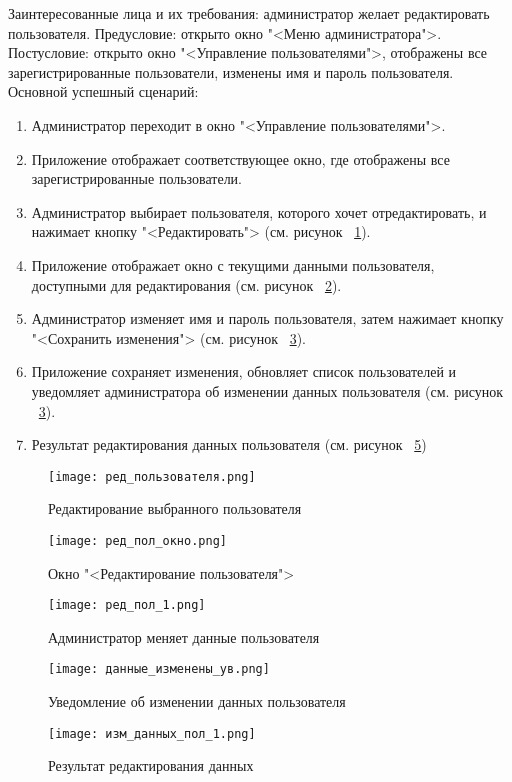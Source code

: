 Заинтересованные лица и их требования: администратор желает редактировать пользователя.
\newline Предусловие: открыто окно "<Меню администратора">.
\newline Постусловие: открыто окно "<Управление пользователями">, отображены все зарегистрированные пользователи, изменены имя и пароль пользователя.
\newline Основной успешный сценарий:
\begin{enumerate}
	\item Администратор переходит в окно "<Управление пользователями">.
	\item Приложение отображает соответствующее окно, где отображены все зарегистрированные пользователи.
	\item Администратор выбирает пользователя, которого хочет отредактировать, и нажимает кнопку "<Редактировать"> (см. рисунок ~\ref{edit_user:image}).
	\item Приложение отображает окно с текущими данными пользователя, доступными для редактирования (см. рисунок ~\ref{edit_user_window:image}).
	\item Администратор изменяет имя и пароль пользователя, затем нажимает кнопку "<Сохранить изменения"> (см. рисунок ~\ref{edit_user_1:image}).
	\item Приложение сохраняет изменения, обновляет список пользователей и уведомляет администратора об изменении данных пользователя (см. рисунок ~\ref{edit_user_1:image}).
	\item Результат редактирования данных пользователя (см. рисунок ~\ref{edit_user_2:image})
\end{enumerate}

\begin{figure}[H]
	\centering
	\texttt{[image: ред\_пользователя.png]}
	\caption{Редактирование выбранного пользователя}
	\label{edit_user:image}
\end{figure}
\begin{figure}[H]
	\centering
	\texttt{[image: ред\_пол\_окно.png]}
	\caption{Окно "<Редактирование пользователя">}
	\label{edit_user_window:image}
\end{figure}
\begin{figure}[H]
	\centering
	\texttt{[image: ред\_пол\_1.png]}
	\caption{Администратор меняет данные пользователя}
	\label{edit_user_1:image}
\end{figure}
\begin{figure}[H]
	\centering
	\texttt{[image: данные\_изменены\_ув.png]}
	\caption{Уведомление об изменении данных пользователя}
	\label{edit_user_notif:image}
\end{figure}
\begin{figure}[H]
	\centering
	\texttt{[image: изм\_данных\_пол\_1.png]}
	\caption{Результат редактирования данных}
	\label{edit_user_2:image}
\end{figure}

